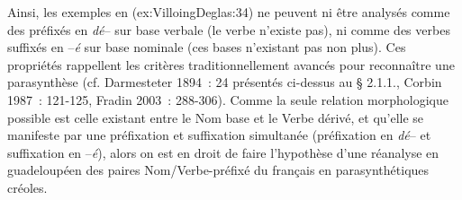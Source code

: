 \documentclass[output=paper]{langsci/langscibook}
\begin{document}
\ea \label{ex:VilloingDeglas:35b}
      \z
\ex \label{ex:VilloingDeglas:35c}
\z\z

Ainsi, les exemples en (ex:VilloingDeglas:34) ne peuvent ni être analysés comme des
préfixés en \emph{dé}-- sur base verbale (le verbe n'existe pas), ni
comme des verbes suffixés en --\emph{é} sur base nominale (ces bases
n'existant pas non plus). Ces propriétés rappellent les critères
traditionnellement avancés pour reconnaître une parasynthèse (cf.
Darmesteter 1894~: 24 présentés ci-dessus au § 2.1.1., Corbin 1987~:
121-125, Fradin 2003~: 288-306). Comme la seule relation morphologique
possible est celle existant entre le Nom base et le Verbe dérivé, et
qu'elle se manifeste par une préfixation et suffixation simultanée
(préfixation en \emph{dé}-- et suffixation en --\emph{é}), alors on est
en droit de faire l'hypothèse d'une réanalyse en guadeloupéen des paires
Nom/Verbe-préfixé du français en parasynthétiques créoles.
\end{document}
